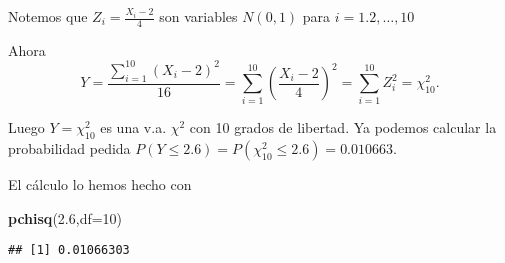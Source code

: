 \documentclass[
]{article}
\newenvironment{Shaded}{\begin{snugshade}}{\end{snugshade}}
\newcommand{\DataTypeTok}[1]{\textcolor[rgb]{0.13,0.29,0.53}{#1}}
\newcommand{\DecValTok}[1]{\textcolor[rgb]{0.00,0.00,0.81}{#1}}
\newcommand{\FloatTok}[1]{\textcolor[rgb]{0.00,0.00,0.81}{#1}}
\newcommand{\KeywordTok}[1]{\textcolor[rgb]{0.13,0.29,0.53}{\textbf{#1}}}
\newcommand{\NormalTok}[1]{#1}
\begin{document}
Notemos que \(Z_i=\frac{X_i-2}{4}\) son variables \(N(0,1)\) para
\(i=1.2,\ldots,10\)

Ahora \[
Y=\frac{\sum\limits_{i=1}^{10}{(X_i-2)}^2}{16}=
\sum\limits_{i=1}^{10}\left(\frac{X_i-2}{4}\right)^2=
\sum\limits_{i=1}^{10} Z_i^2=\chi_{10}^2.
\]

Luego \(Y=\chi_{10}^2\) es una v.a. \(\chi^2\) con 10 grados de
libertad. Ya podemos calcular la probabilidad pedida
\(P(Y\leq 2.6)=P(\chi_{10}^2\leq 2.6)=0.010663.\)

El cálculo lo hemos hecho con

\begin{Shaded}
\begin{Highlighting}[]
\KeywordTok{pchisq}\NormalTok{(}\FloatTok{2.6}\NormalTok{,}\DataTypeTok{df=}\DecValTok{10}\NormalTok{)}
\end{Highlighting}
\end{Shaded}

\begin{verbatim}
## [1] 0.01066303
\end{verbatim}
\end{document}
